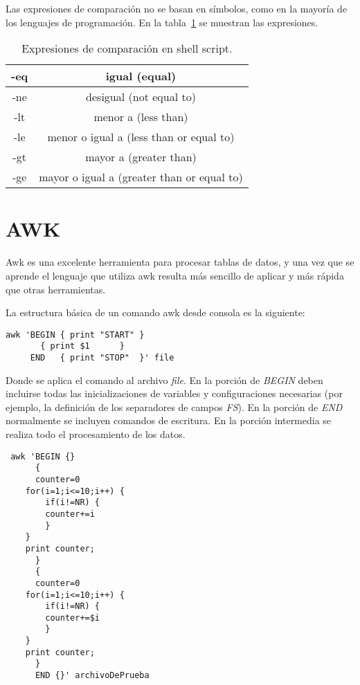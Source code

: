 Las expresiones de comparación no se basan en símbolos, como en la mayoría de los lenguajes de programación. En la tabla~\ref{AC:tbl:comp}
se muestran las expresiones.
\begin{table}[htp]
\begin{center}
\begin{tabular}{*{2}{c}}
\hline
-eq&	igual (equal)\\ \hline
-ne&	desigual (not equal to)\\ \hline
-lt&	menor a (less than)\\ \hline
-le&	menor o igual a (less than or equal to)\\ \hline
-gt&	mayor a (greater than)\\ \hline
-ge&	mayor o igual a (greater than or equal to)\\ \hline
\end{tabular}
\end{center}
\caption[Expresiones de comparación en shell script.]{Expresiones de comparación en shell script.}
\label{AC:tbl:comp}
\end{table}

\section{AWK}

Awk es una excelente herramienta para procesar tablas de datos, y una vez que se aprende el lenguaje que utiliza awk resulta más sencillo de
aplicar y más rápida que otras herramientas.

La estructura básica de un comando awk desde consola es la siguiente:
\begin{lstlisting}
awk 'BEGIN { print "START" }
	   { print $1      }
     END   { print "STOP"  }' file
\end{lstlisting}

Donde se aplica el comando al archivo \textit{file}. En la porción de \textit{BEGIN} deben incluirse todas las inicializaciones de variables
y configuraciones necesarias (por ejemplo, la definición de los separadores de campos \textit{FS}). En la porción de \textit{END} normalmente
se incluyen comandos de escritura. En la porción intermedia se realiza todo el procesamiento de los datos.
\begin{lstlisting}
 awk 'BEGIN {}
      {
      counter=0
	for(i=1;i<=10;i++) {
	    if(i!=NR) {
		counter+=i
	    }
	}
	print counter;
      } 
      {
      counter=0
	for(i=1;i<=10;i++) {
	    if(i!=NR) {
		counter+=$i
	    }
	}
	print counter;
      }
      END {}' archivoDePrueba
\end{lstlisting}

